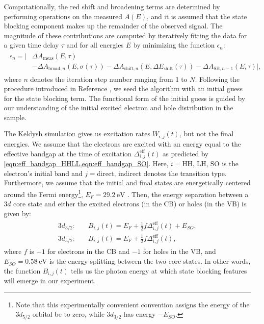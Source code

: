 Computationally, the red shift and broadening terms are determined by performing operations on the measured $A(E)$, and it is assumed that the state blocking component makes up the remainder of the observed signal. The magnitude of these contributions are computed by iteratively fitting the data for a given time delay $\tau$ and for all energies $E$ by minimizing the function $\epsilon_n$:
\begin{align}
\begin{split}
\epsilon_n = \Big| & \Delta A_{\textrm{meas}}(E,\tau) \\
&- \Delta A_{\textrm{broad},n}(E,\sigma(\tau)) - \Delta A_{\textrm{shift},n}(E,\Delta E_{\textrm{shift}}(\tau)) - \Delta A_{\textrm{SB},n-1}(E,\tau) \Big|,
\end{split}
\end{align}
where $n$ denotes the iteration step number ranging from 1 to $N$. Following the procedure introduced in Reference \cite{zurchDirectSimultaneousObservation2017}, we seed the algorithm with an initial guess for the state blocking term. The functional form of the initial guess is guided by our understanding of the initial excited electron and hole distribution in the sample.

The Keldysh simulation gives us excitation rates $W_{i,j}(t)$, but not the final energies. We assume that the electrons are excited with an energy equal to the effective bandgap at the time of excitation $\Delta^{\textrm{eff}}_{i,j}(t)$ as predicted by \cref{eqn:eff_bandgap_HHLL,eqn:eff_bandgap_SO}. Here, $i=\textrm{HH, LH, SO}$ is the electron's initial band and $j=\textrm{direct, indirect}$ denotes the transition type. Furthermore, we assume that the initial and final states are energetically centered around the Fermi energy\footnote{Note that this experimentally convenient convention assigns the energy of the $3d_{5/2}$ orbital be to zero, while $3d_{3/2}$ has energy $-E_{SO}$.}, $E_F = 29.2 \ \textrm{eV}$ \cite{zurchDirectSimultaneousObservation2017}. Then, the energy separation between a $3d$ core state and either the excited electrons (in the CB) or holes (in the VB) is given by:
\begin{align}
\begin{split}
3d_{3/2}:& \quad B_{i,j}(t) = E_F + \frac{1}{2} f \Delta_{i,j}^{\textrm{eff}}(t) + E_{SO}, \\
3d_{5/2}:& \quad B_{i,j}(t) = E_F + \frac{1}{2} f \Delta_{i,j}^{\textrm{eff}}(t),
\end{split}
\end{align}
where $f$ is $+1$ for electrons in the CB and $-1$ for holes in the VB, and $E_{SO} = 0.58 \ \textrm{eV}$ is the energy splitting between the two core states. In other words, the function $B_{i,j}(t)$ tells us the photon energy at which state blocking features will emerge in our experiment.

